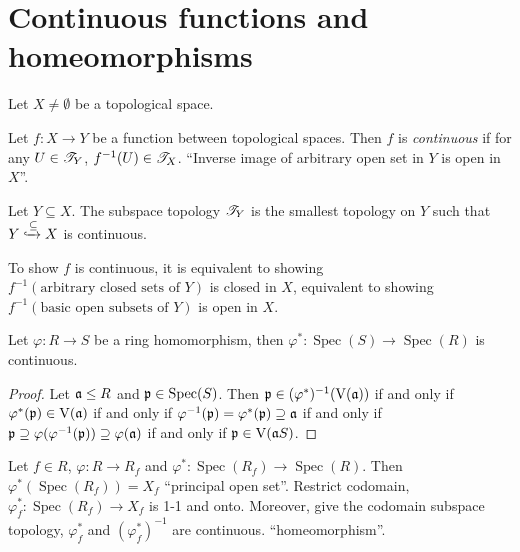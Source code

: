 \section*{Continuous functions and homeomorphisms}

Let $X \neq \emptyset$ be a topological space. 

\begin{definition}
    Let $f: X \to Y$ be a function between topological spaces. Then $f$ is \emph{continuous} if for any $U \in \mathscr{T}_Y$, $f^{-1}(U) \in \mathscr{T}_X$. ``Inverse image of arbitrary open set in $Y$ is open in $X$''. 
\end{definition}

\begin{remark}
    Let $Y \subseteq X$. The subspace topology $\mathscr{T}_Y$ is the smallest topology on $Y$ such that $Y \xhookrightarrow \subseteq X$ is continuous. \par 
\end{remark}

\begin{fact}
    To show $f$ is continuous, it is equivalent to showing $f^{-1}(\text{arbitrary closed sets of $Y$})$ is closed in $X$, equivalent to showing $f^{-1}(\text{basic open subsets of $Y$})$ is open in $X$.
\end{fact}

\begin{theorem}
    Let $\varphi: R \to S$ be a ring homomorphism, then $\varphi^*: \operatorname{Spec}(S) \to \operatorname{Spec}(R)$ is continuous. 
\end{theorem}

\begin{proof}
    Let $\mathfrak{a} \leq R$ and $\mathfrak{p} \in \operatorname{Spec}(S)$. Then $\mathfrak{p} \in (\varphi^*)^{-1}(\operatorname{V}(\mathfrak{a}))$ if and only if $\varphi^*(\mathfrak{p}) \in \operatorname{V}(\mathfrak{a})$ if and only if $\varphi^{-1}(\mathfrak{p}) = \varphi^*(\mathfrak{p}) \supseteq \mathfrak{a}$ if and only if $\mathfrak{p} \supseteq \varphi(\varphi^{-1}(\mathfrak{p})) \supseteq \varphi(\mathfrak{a})$ if and only if $\mathfrak{p} \in \operatorname{V}(\mathfrak{a} S)$.
\end{proof}

\begin{theorem}
    Let $f \in R$, $\varphi: R \to R_f$ and $\varphi^*: \operatorname{Spec}(R_f) \to \operatorname{Spec}(R)$. Then  $\varphi^*(\operatorname{Spec}(R_f)) = X_f$ ``principal open set''. Restrict codomain, $\varphi_f^*: \operatorname{Spec}(R_f) \to X_f$ is 1-1 and onto. Moreover, give the codomain subspace topology, $\varphi_f^*$ and $(\varphi_f^*)^{-1}$ are continuous. ``homeomorphism''. 
\end{theorem}

